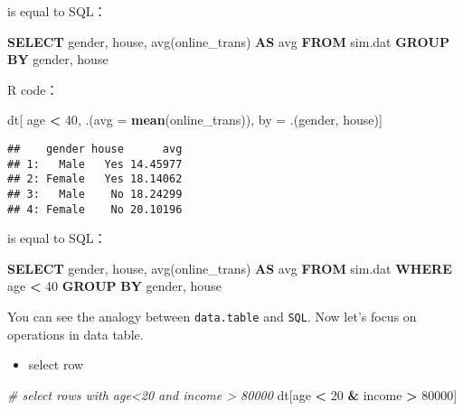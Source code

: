 \documentclass[
]{article}
\newenvironment{Shaded}{\begin{snugshade}}{\end{snugshade}}
\newcommand{\CommentTok}[1]{\textcolor[rgb]{0.56,0.35,0.01}{\textit{#1}}}
\newcommand{\DataTypeTok}[1]{\textcolor[rgb]{0.13,0.29,0.53}{#1}}
\newcommand{\DecValTok}[1]{\textcolor[rgb]{0.00,0.00,0.81}{#1}}
\newcommand{\FunctionTok}[1]{\textcolor[rgb]{0.00,0.00,0.00}{#1}}
\newcommand{\KeywordTok}[1]{\textcolor[rgb]{0.13,0.29,0.53}{\textbf{#1}}}
\newcommand{\NormalTok}[1]{#1}
\newcommand{\OperatorTok}[1]{\textcolor[rgb]{0.81,0.36,0.00}{\textbf{#1}}}
\newcommand{\StringTok}[1]{\textcolor[rgb]{0.31,0.60,0.02}{#1}}
\providecommand{\tightlist}{%
  \setlength{\itemsep}{0pt}\setlength{\parskip}{0pt}}
\begin{document}
is equal to SQL：

\begin{Shaded}
\begin{Highlighting}[]
\KeywordTok{SELECT}\NormalTok{ gender, house, }\FunctionTok{avg}\NormalTok{(online_trans) }\KeywordTok{AS} \FunctionTok{avg} \KeywordTok{FROM}\NormalTok{ sim.dat }\KeywordTok{GROUP} \KeywordTok{BY}\NormalTok{ gender, house}
\end{Highlighting}
\end{Shaded}

R code：

\begin{Shaded}
\begin{Highlighting}[]
\NormalTok{dt[ age }\OperatorTok{<}\StringTok{ }\DecValTok{40}\NormalTok{, .(}\DataTypeTok{avg =} \KeywordTok{mean}\NormalTok{(online_trans)), by =}\StringTok{ }\NormalTok{.(gender, house)]}
\end{Highlighting}
\end{Shaded}

\begin{verbatim}
##    gender house      avg
## 1:   Male   Yes 14.45977
## 2: Female   Yes 18.14062
## 3:   Male    No 18.24299
## 4: Female    No 20.10196
\end{verbatim}

is equal to SQL：

\begin{Shaded}
\begin{Highlighting}[]
\KeywordTok{SELECT}\NormalTok{ gender, house, }\FunctionTok{avg}\NormalTok{(online_trans) }\KeywordTok{AS} \FunctionTok{avg} \KeywordTok{FROM}\NormalTok{ sim.dat }\KeywordTok{WHERE}\NormalTok{ age }\OperatorTok{<} \DecValTok{40} \KeywordTok{GROUP} \KeywordTok{BY}\NormalTok{ gender, house}
\end{Highlighting}
\end{Shaded}

You can see the analogy between \texttt{data.table} and \texttt{SQL}.
Now let's focus on operations in data table.

\begin{itemize}
\tightlist
\item
  select row
\end{itemize}

\begin{Shaded}
\begin{Highlighting}[]
\CommentTok{# select rows with age<20 and income > 80000}
\NormalTok{dt[age }\OperatorTok{<}\StringTok{ }\DecValTok{20} \OperatorTok{&}\StringTok{ }\NormalTok{income }\OperatorTok{>}\StringTok{ }\DecValTok{80000}\NormalTok{]}
\end{Highlighting}
\end{Shaded}
\end{document}

